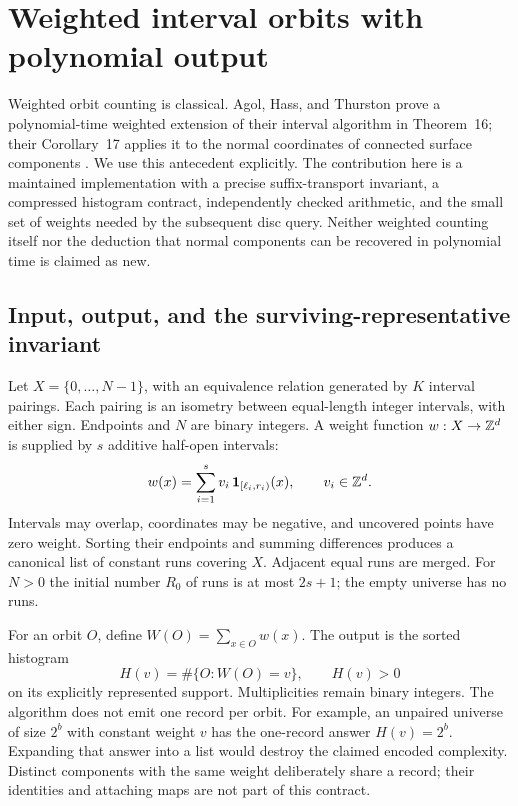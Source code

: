 \section{Weighted interval orbits with polynomial output}
\label{sec:weighted-orbits}

Weighted orbit counting is classical. Agol, Hass, and Thurston prove a
polynomial-time weighted extension of their interval algorithm in Theorem~16;
their Corollary~17 applies it to the normal coordinates of connected surface
components \cite{AHT2006}. We use this antecedent explicitly. The contribution
here is a maintained implementation with a precise suffix-transport invariant,
a compressed histogram contract, independently checked arithmetic, and the
small set of weights needed by the subsequent disc query. Neither weighted
counting itself nor the deduction that normal components can be recovered in
polynomial time is claimed as new.

\subsection{Input, output, and the surviving-representative invariant}

Let $X=\{0,\ldots,N-1\}$, with an equivalence relation generated by $K$
interval pairings. Each pairing is an isometry between equal-length integer
intervals, with either sign. Endpoints and $N$ are binary integers. A weight
function $w:X\to\mathbb Z^d$ is supplied by $s$ additive half-open intervals:
\[
 w(x)=\sum_{i=1}^{s} v_i\,\mathbf 1_{[\ell_i,r_i)}(x),
 \qquad v_i\in\mathbb Z^d.
\]
Intervals may overlap, coordinates may be negative, and uncovered points have
zero weight. Sorting their endpoints and summing differences produces a
canonical list of constant runs covering $X$. Adjacent equal runs are merged.
For $N>0$ the initial number $R_0$ of runs is at most $2s+1$; the empty universe
has no runs.

For an orbit $O$, define $W(O)=\sum_{x\in O}w(x)$. The output is the sorted
histogram
\[
 H(v)=\#\{O:W(O)=v\}, \qquad H(v)>0
\]
on its explicitly represented support. Multiplicities remain binary integers.
The algorithm does not emit one record per orbit. For example, an unpaired
universe of size $2^b$ with constant weight $v$ has the one-record answer
$H(v)=2^b$. Expanding that answer into a list would destroy the claimed encoded
complexity. Distinct components with the same weight deliberately share a
record; their identities and attaching maps are not part of this contract.

